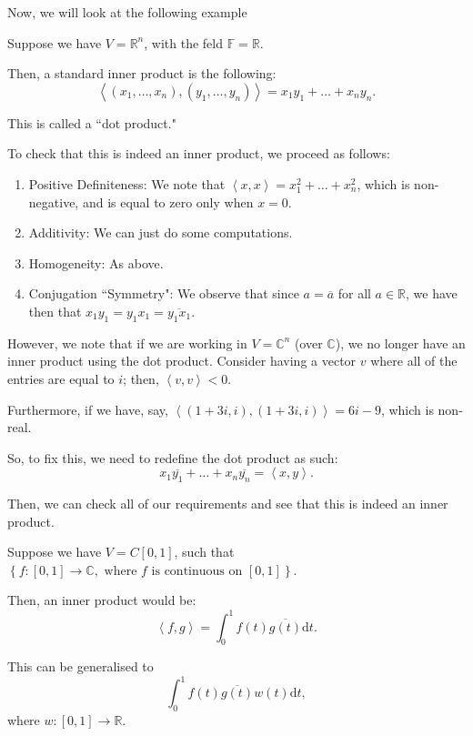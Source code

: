 \documentclass[openany]{book}
\newcommand{\CC}{\mathbb{C}}
\newcommand{\RR}{\mathbb{R}}
\newcommand{\innerproduct}[2]{\left\langle{#1}, {#2}\right\rangle}
\begin{document}
Now, we will look at the following example
\begin{example}
	Suppose we have $V = \RR^{n}$, with the feld $\mathbb{F} = \RR$.
	
	Then, a standard inner product is the following:
	\begin{equation*}
		\innerproduct{(x_{1}, \ldots, x_{n})}{(y_{1}, \ldots, y_{n})} = x_{1}y_{1} + \ldots + x_{n}y_{n}.
	\end{equation*}

	This is called a ``dot product."
	
	To check that this is indeed an inner product, we proceed as follows:
	\begin{enumerate}
		\item Positive Definiteness: We note that $\innerproduct{x}{x} = x_{1}^{2} + \ldots + x_{n}^{2}$, which is non-negative, and is equal to zero only when $x = 0$.
		\item Additivity: We can just do some computations.
		\item Homogeneity: As above.
		\item Conjugation ``Symmetry": We observe that since $a = \overline{a}$ for all $a \in \RR$, we have then that $x_{1}y_{1} = y_{1}x_{1} = \overline{y_{1}x_{1}}$. 
	\end{enumerate}
\end{example}

\begin{example}[Modifying the Dot Product for $\CC$]
	However, we note that if we are working in $V = \CC^{n}$ (over $\CC$), we no longer have an inner product using the dot product. Consider having a vector $v$ where all of the entries are equal to $i$; then, $\innerproduct{v}{v} < 0$.

	Furthermore, if we have, say, $\innerproduct{(1+3i, i)}{(1+3i, i)} = 6i - 9$, which is non-real.

	So, to fix this, we need to redefine the dot product as such:
	\begin{equation*}
		x_{1}\overline{y_{1}} + \ldots + x_{n}\overline{y_{n}} = \innerproduct{x}{y}.
	\end{equation*}

	Then, we can check all of our requirements and see that this is indeed an inner product.
\end{example}

\begin{example}
	Suppose we have $V = C[0,1]$, such that $\left\{  f : [0,1] \rightarrow \CC, \text{ where $f$ is continuous on $[0,1]$}\right\}$.
	
	Then, an inner product would be:
	\begin{equation*}
		\innerproduct{f}{g} = \int_{0}^{1}	f(t) \overline{g(t)} \mathrm dt.
	\end{equation*}

	This can be generalised to
	\begin{equation*}
		\int_{0}^{1} f(t)\overline{g(t)} w(t) \mathrm dt,
	\end{equation*}
	where $w : [0,1] \rightarrow \RR$.
\end{example}
\end{document}

